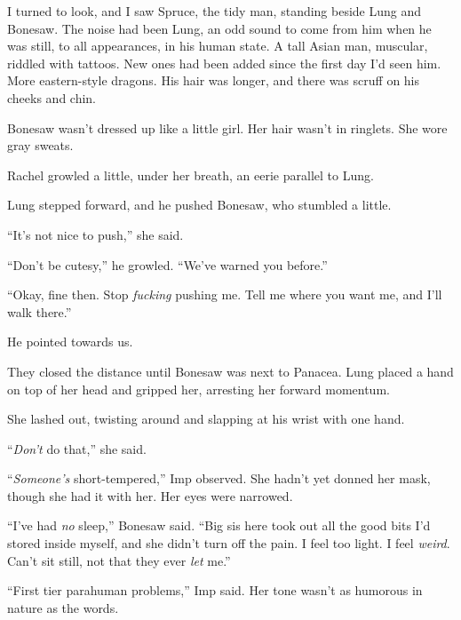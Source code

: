 I turned to look, and I saw Spruce, the tidy man, standing beside Lung and Bonesaw.  The noise had been Lung, an odd sound to come from him when he was still, to all appearances, in his human state.  A tall Asian man, muscular, riddled with tattoos.  New ones had been added since the first day I'd seen him.  More eastern-style dragons.  His hair was longer, and there was scruff on his cheeks and chin.



Bonesaw wasn't dressed up like a little girl.  Her hair wasn't in ringlets.  She wore gray sweats.



Rachel growled a little, under her breath, an eerie parallel to Lung.



Lung stepped forward, and he pushed Bonesaw, who stumbled a little.



``It's not nice to push,'' she said.



``Don't be cutesy,'' he growled.  ``We've warned you before.''



``Okay, fine then.  Stop \emph{fucking} pushing me.  Tell me where you want me, and I'll walk there.''



He pointed towards us.



They closed the distance until Bonesaw was next to Panacea.  Lung placed a hand on top of her head and gripped her, arresting her forward momentum.



She lashed out, twisting around and slapping at his wrist with one hand.



``\emph{Don't} do that,'' she said.



``\emph{Someone's} short-tempered,'' Imp observed.  She hadn't yet donned her mask, though she had it with her.  Her eyes were narrowed.



``I've had \emph{no} sleep,'' Bonesaw said.  ``Big sis here took out all the good bits I'd stored inside myself, and she didn't turn off the pain.  I feel too light.  I feel \emph{weird}.  Can't sit still, not that they ever \emph{let} me.''



``First tier parahuman problems,'' Imp said.  Her tone wasn't as humorous in nature as the words.



